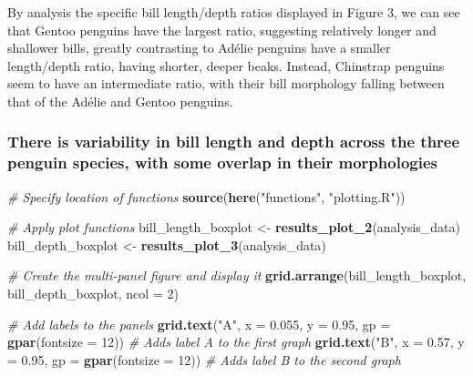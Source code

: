 \documentclass[
]{article}
\newenvironment{Shaded}{\begin{snugshade}}{\end{snugshade}}
\newcommand{\AttributeTok}[1]{\textcolor[rgb]{0.13,0.29,0.53}{#1}}
\newcommand{\CommentTok}[1]{\textcolor[rgb]{0.56,0.35,0.01}{\textit{#1}}}
\newcommand{\DecValTok}[1]{\textcolor[rgb]{0.00,0.00,0.81}{#1}}
\newcommand{\FloatTok}[1]{\textcolor[rgb]{0.00,0.00,0.81}{#1}}
\newcommand{\FunctionTok}[1]{\textcolor[rgb]{0.13,0.29,0.53}{\textbf{#1}}}
\newcommand{\NormalTok}[1]{#1}
\newcommand{\OtherTok}[1]{\textcolor[rgb]{0.56,0.35,0.01}{#1}}
\newcommand{\StringTok}[1]{\textcolor[rgb]{0.31,0.60,0.02}{#1}}
\begin{document}
By analysis the specific bill length/depth ratios displayed in Figure 3,
we can see that Gentoo penguins have the largest ratio, suggesting
relatively longer and shallower bills, greatly contrasting to Adélie
penguins have a smaller length/depth ratio, having shorter, deeper
beaks. Instead, Chinstrap penguins seem to have an intermediate ratio,
with their bill morphology falling between that of the Adélie and Gentoo
penguins.

\subsubsection{There is variability in bill length and depth across the
three penguin species, with some overlap in their
morphologies}\label{there-is-variability-in-bill-length-and-depth-across-the-three-penguin-species-with-some-overlap-in-their-morphologies}

\begin{Shaded}
\begin{Highlighting}[]
\CommentTok{\# Specify location of functions }
\FunctionTok{source}\NormalTok{(}\FunctionTok{here}\NormalTok{(}\StringTok{"functions"}\NormalTok{, }\StringTok{"plotting.R"}\NormalTok{))}

\CommentTok{\# Apply plot functions}
\NormalTok{bill\_length\_boxplot }\OtherTok{\textless{}{-}} \FunctionTok{results\_plot\_2}\NormalTok{(analysis\_data)}
\NormalTok{bill\_depth\_boxplot }\OtherTok{\textless{}{-}} \FunctionTok{results\_plot\_3}\NormalTok{(analysis\_data)}

\CommentTok{\# Create the multi{-}panel figure and display it}
\FunctionTok{grid.arrange}\NormalTok{(bill\_length\_boxplot, bill\_depth\_boxplot, }\AttributeTok{ncol =} \DecValTok{2}\NormalTok{)}

\CommentTok{\# Add labels to the panels}
\FunctionTok{grid.text}\NormalTok{(}\StringTok{"A"}\NormalTok{, }\AttributeTok{x =} \FloatTok{0.055}\NormalTok{, }\AttributeTok{y =} \FloatTok{0.95}\NormalTok{, }\AttributeTok{gp =} \FunctionTok{gpar}\NormalTok{(}\AttributeTok{fontsize =} \DecValTok{12}\NormalTok{))  }\CommentTok{\# Adds label \textquotesingle{}A\textquotesingle{} to the first graph}
\FunctionTok{grid.text}\NormalTok{(}\StringTok{"B"}\NormalTok{, }\AttributeTok{x =} \FloatTok{0.57}\NormalTok{, }\AttributeTok{y =} \FloatTok{0.95}\NormalTok{, }\AttributeTok{gp =} \FunctionTok{gpar}\NormalTok{(}\AttributeTok{fontsize =} \DecValTok{12}\NormalTok{))  }\CommentTok{\# Adds label \textquotesingle{}B\textquotesingle{} to the second graph}
\end{Highlighting}
\end{Shaded}
\end{document}
